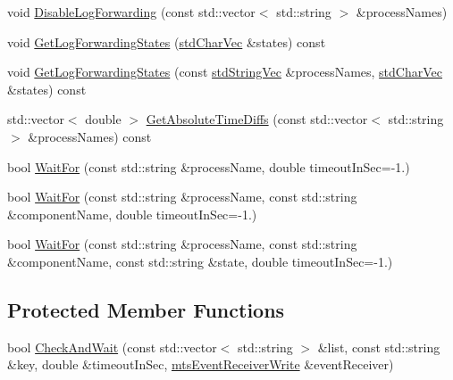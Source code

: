 \begin{DoxyCompactItemize}
void \hyperlink{classmts_manager_component_services_a4e336336253d0317957cbdc528788f85}{Disable\+Log\+Forwarding} (const std\+::vector$<$ std\+::string $>$ \&process\+Names)
\item 
void \hyperlink{classmts_manager_component_services_a6005565054c1a672521068c042b41e46}{Get\+Log\+Forwarding\+States} (\hyperlink{mts_generic_object_proxy_8h_a3fcb43cabc338a5aee6772138bee2416}{std\+Char\+Vec} \&states) const 
\item 
void \hyperlink{classmts_manager_component_services_a30d202afee529511340ee669a4f6c272}{Get\+Log\+Forwarding\+States} (const \hyperlink{mts_generic_object_proxy_8h_ae2238149254430b4959aa4e16892fc07}{std\+String\+Vec} \&process\+Names, \hyperlink{mts_generic_object_proxy_8h_a3fcb43cabc338a5aee6772138bee2416}{std\+Char\+Vec} \&states) const 
\item 
std\+::vector$<$ double $>$ \hyperlink{classmts_manager_component_services_ae94c0e549cbbfc1aae0317c852f7bb10}{Get\+Absolute\+Time\+Diffs} (const std\+::vector$<$ std\+::string $>$ \&process\+Names) const 
\item 
bool \hyperlink{classmts_manager_component_services_abeba632d29ddc21c78749bdc45ca77f0}{Wait\+For} (const std\+::string \&process\+Name, double timeout\+In\+Sec=-\/1.)
\item 
bool \hyperlink{classmts_manager_component_services_aeab518d92e65fa518daab70b6b0b2536}{Wait\+For} (const std\+::string \&process\+Name, const std\+::string \&component\+Name, double timeout\+In\+Sec=-\/1.)
\item 
bool \hyperlink{classmts_manager_component_services_a51f220f9475f7193ad1deb4ccfded73f}{Wait\+For} (const std\+::string \&process\+Name, const std\+::string \&component\+Name, const std\+::string \&state, double timeout\+In\+Sec=-\/1.)
\end{DoxyCompactItemize}

\subsection*{Protected Member Functions}
\begin{DoxyCompactItemize}
\item 
bool \hyperlink{classmts_manager_component_services_ad614ba5609bf014f5b0f26de272ff366}{Check\+And\+Wait} (const std\+::vector$<$ std\+::string $>$ \&list, const std\+::string \&key, double \&timeout\+In\+Sec, \hyperlink{classmts_event_receiver_write}{mts\+Event\+Receiver\+Write} \&event\+Receiver)
\end{DoxyCompactItemize}
